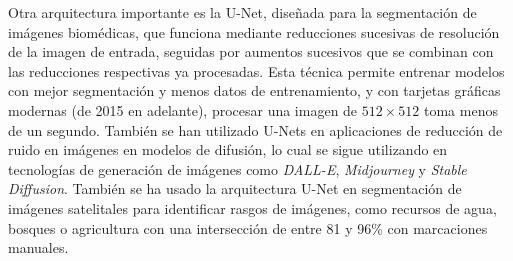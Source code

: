 Otra arquitectura importante es la U-Net, diseñada para la segmentación de imágenes biomédicas, que funciona mediante
reducciones sucesivas de resolución de la imagen de entrada, seguidas por aumentos sucesivos que se combinan con las
reducciones respectivas ya procesadas. Esta técnica permite entrenar modelos con mejor segmentación y menos datos de
entrenamiento, y con tarjetas gráficas modernas (de 2015 en adelante), procesar una imagen de $512 \times 512$ toma
menos de un segundo. \autocite{ronneberger2015unetconvolutionalnetworksbiomedical} También se han utilizado U-Nets en
aplicaciones de reducción de ruido en imágenes en modelos de difusión, lo cual se sigue utilizando en tecnologías de
generación de imágenes como {\it DALL-E}, {\it Midjourney} y {\it Stable Diffusion}. \autocite{ho2020denoising} También
se ha usado la arquitectura U-Net en segmentación de imágenes satelitales para identificar rasgos de imágenes, como
recursos de agua, bosques o agricultura con una intersección de entre 81 y 96\% con marcaciones manuales.
\autocite{khryashchev2018}
